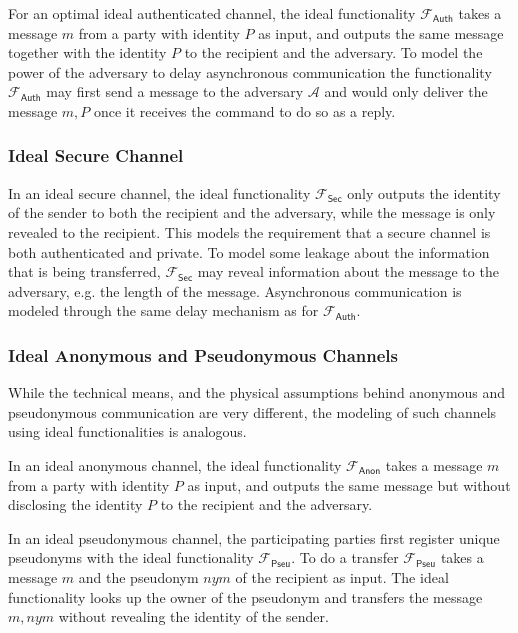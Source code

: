 \documentclass[11pt,a4paper]{report}
\theoremstyle{definition}
\theoremstyle{remark}
\begin{document}
For an optimal ideal authenticated channel, the ideal functionality
$\mathcal{F}_{\mathsf{Auth}}$ takes a message $m$ from a party with identity $P$
as input, and outputs the same message together with the identity $P$ to the
recipient and the adversary. To model the power of the adversary to delay
asynchronous communication the functionality $\mathcal{F}_{\mathsf{Auth}}$ may
first send a message to the adversary $\mathcal{A}$ and would only deliver the
message $m,P$ once it receives the command to do so as a reply.

\subsubsection{Ideal Secure Channel}

In an ideal secure channel, the ideal functionality $\mathcal{F}_{\mathsf{Sec}}$
only outputs the identity of the sender to both the recipient and the adversary,
while the message is only revealed to the recipient. This models the requirement
that a secure channel is both authenticated and private. To model some leakage
about the information that is being transferred, $\mathcal{F}_{\mathsf{Sec}}$
may reveal information about the message to the adversary, e.g. the length of
the message. Asynchronous communication is modeled through the same delay
mechanism as for $\mathcal{F}_{\mathsf{Auth}}$.

\subsubsection{Ideal Anonymous and Pseudonymous Channels}

While the technical means, and the physical assumptions behind anonymous and
pseudonymous communication are very different, the modeling of such channels
using ideal functionalities is analogous.

In an ideal anonymous channel, the ideal functionality $\mathcal{F}_{\mathsf{Anon}}$
takes a message $m$ from a party with identity $P$ as input, and outputs the
same message but without disclosing the identity $P$ to the recipient and the
adversary.

In an ideal pseudonymous channel, the participating parties first register
unique pseudonyms with the ideal functionality $\mathcal{F}_{\mathsf{Pseu}}$. To
do a transfer $\mathcal{F}_{\mathsf{Pseu}}$ takes a message $m$ and the
pseudonym $nym$ of the recipient as input. The ideal functionality looks up the
owner of the pseudonym and transfers the message $m,nym$ without revealing the
identity of the sender.
\end{document}
